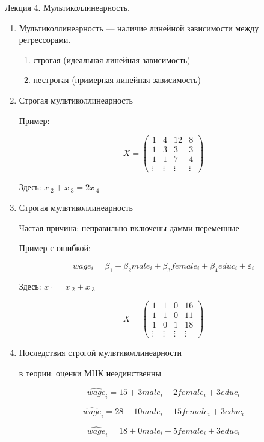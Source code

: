 \documentclass[12pt,a4paper]{article}
\begin{document}
{\Huge


Лекция 4. Мультиколлинеарность.


\begin{enumerate}
\item Мультиколлинеарность --- наличие линейной зависимости между регрессорами.

\begin{enumerate}
\item строгая (идеальная линейная зависимость) 
\item нестрогая (примерная линейная зависимость)
\end{enumerate}

\item Строгая мультиколлинеарность

Пример:

\[
X=\begin{pmatrix}
1 & 4 & 12 & 8 \\ 
1 & 3 & 3 & 3 \\ 
1 & 1 & 7 & 4 \\ 
\vdots & \vdots & \vdots & \vdots
\end{pmatrix} 
\]

Здесь: $x_{\cdot 2}+x_{\cdot 3}=2x_{\cdot 4}$

\item Строгая мультиколлинеарность 

Частая причина: неправильно включены дамми-переменные

Пример с ошибкой: 

\[
wage_i=\beta_1 + \beta_2 male_i + \beta_3 female_i + \beta_4 educ_i + \varepsilon_i
\]

Здесь:  $x_{\cdot 1}=x_{\cdot 2}+x_{\cdot 3}$

\[
X=\begin{pmatrix}
1 & 1 & 0 & 16 \\ 
1 & 1 & 0 & 11 \\ 
1 & 0 & 1 & 18 \\ 
\vdots & \vdots & \vdots & \vdots
\end{pmatrix} 
\]


\item Последствия строгой мультиколлинеарности

в теории: оценки МНК неединственны

\[
\widehat{wage}_i=15 + 3 male_i -2 female_i + 3 educ_i 
\]

\[
\widehat{wage}_i=28 -10 male_i -15 female_i + 3 educ_i 
\]

\[
\widehat{wage}_i=18 + 0 male_i -5 female_i + 3 educ_i 
\]




\end{enumerate}}
\end{document}
